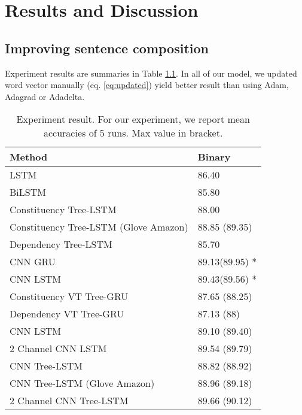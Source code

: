 \chapter{Results and Discussion}\label{result-discuss}


\section{Improving sentence composition}
Experiment results are summaries in Table \ref{table:experimentresult}. In all of our model, we updated word vector manually (eq. \ref{eq:updated}) yield better result than using Adam, Adagrad or Adadelta. 

\begin{table}[H]
	\centering
	\caption{Experiment result. For our experiment, we report mean accuracies of 5 runs. Max value in bracket.}
	\label{table:experimentresult}
	\begin{tabular}{ll}
		Method                                   & Binary \\ \hline
		LSTM                                     & 86.40   \\
		BiLSTM                                   & 85.80   \\ \hline
		Constituency Tree-LSTM \cite{treeLSTM} & 88.00     \\
		Constituency Tree-LSTM \cite{treeLSTM} (Glove Amazon) & 88.85 (89.35) \\
		Dependency Tree-LSTM  \cite{treeLSTM}  & 85.70   \\ 
		CNN GRU \cite{cnn-rnn}					& 89.13(89.95) *	\\
		CNN LSTM \cite{cnn-rnn}					& 89.43(89.56) *	\\ \hline
		Constituency VT Tree-GRU                 & 87.65 (88.25)  \\
		Dependency VT Tree-GRU                   & 87.13  (88)  \\ \hline
		CNN LSTM 								& 89.10 (89.40)      \\
		2 Channel CNN LSTM						& 89.54	(89.79)	\\
		CNN Tree-LSTM                            & 88.82 (88.92) \\
		CNN Tree-LSTM (Glove Amazon) 			& 88.96 (89.18) \\
		2 Channel CNN Tree-LSTM  				& 89.66 (90.12)
	\end{tabular}
\end{table}

